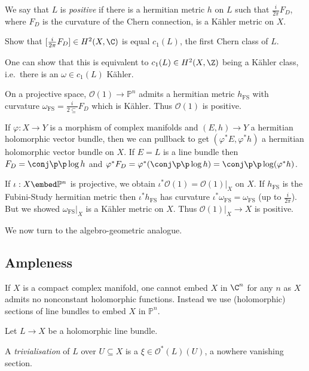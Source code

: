 \documentclass[a4paper]{article}
\renewcommand{\P}{\mathbb P} %
\begin{document}
\begin{definition}[positive]
  We say that \(L\) is \emph{positive} if there is a hermitian metric \(h\) on \(L\) such that \(\frac{i}{2\pi}F_D\), where \(F_D\) is the curvature of the Chern connection, is a Kähler metric on \(X\).
\end{definition}

\begin{ex}
  Show that \([\frac{i}{2\pi} F_D] \in H^2(X, \C)\) is equal \(c_1(L)\), the first Chern class of \(L\).
\end{ex}
One can show that this is equivalent to \(c_1(L) \in H^2(X, \Z)\) being a Kähler class, i.e.\ there is an \(\omega \in c_1(L)\) Kähler.

On a projective space, \(\mathcal O(1) \to \P^n\) admits a hermitian metric \(h_{\text{FS}}\) with curvature \(\omega_{\text{FS}} = \frac{i}{2\subseteq} F_D\) which is Kähler. Thus \(\mathcal O(1)\) is positive.

If \(\varphi: X \to Y\) is a morphism of complex manifolds and \((E, h) \to Y\) a hermitian holomorphic vector bundle, then we can pullback to get \((\varphi^*E, \varphi^*h)\) a hermitian holomorphic vector bundle on \(X\). If \(E = L\) is a line bundle then \(F_D = \conj \p \p \log h\) and \(\varphi^* F_D = \varphi^*(\conj \p \p \log h) = \conj \p \p \log (\varphi^*h)\).

If \(\iota: X \embed \P^n\) is projective, we obtain \(\iota^* \mathcal O(1) = \mathcal O(1)|_X\) on \(X\). If \(h_{\text{FS}}\) is the Fubini-Study hermitian metric then \(\iota^* h_{\text{FS}}\) has curvature \(\iota^* \omega_{\text{FS}} = \omega_{\text{FS}}\) (up to \(\frac{i}{2\pi}\)). But we showed \(\omega_{\text{FS}}|_X\) is a Kähler metric on \(X\). Thus \(\mathcal O(1)|_X \to X\) is positive.

We now turn to the algebro-geometric analogue.

\subsection{Ampleness}

If \(X\) is a compact complex manifold, one cannot embed \(X\) in \(\C^n\) for any \(n\) as \(X\) admits no nonconstant holomorphic functions. Instead we use (holomorphic) sections of line bundles to embed \(X\) in \(\P^n\).

Let \(L \to X\) be a holomorphic line bundle.
\begin{definition}[trivialisation]
  A \emph{trivialisation} of \(L\) over \(U \subseteq X\) is a \(\xi \in \mathcal O^*(L)(U)\), a nowhere vanishing section.
\end{definition}
\end{document}
